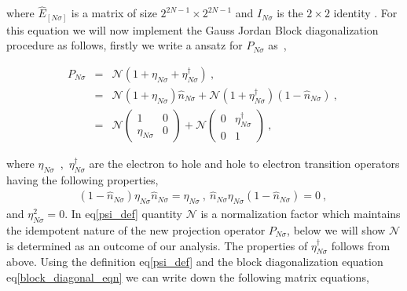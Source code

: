 \documentclass[12pt,a4paper]{article}
\begin{document}
where $\hat{E}_{[N\sigma]}$ is a matrix of size $2^{2N-1}\times 2^{2N-1}$ and $I_{N\sigma}$ is the $2\times 2$ identity . For this equation we will now implement the Gauss Jordan Block diagonalization procedure as follows, firstly we write a ansatz for $P_{N\sigma}$ as~,
\begin{tcolorbox}
\begin{eqnarray}
P_{N\sigma} &=& \mathcal{N}(1+\eta_{N\sigma}+\eta^{\dagger}_{N\sigma})~,\nonumber\\
&=&\mathcal{N}(1+\eta_{N\sigma})\hat{n}_{N\sigma}+\mathcal{N}(1+\eta^{\dagger}_{N\sigma})(1-\hat{n}_{N\sigma})~,~\nonumber\\
&=&\mathcal{N}\begin{pmatrix}
1 & 0\\
\eta_{N\sigma} & 0
\end{pmatrix}+\mathcal{N}\begin{pmatrix}
0 & \eta^{\dagger}_{N\sigma}\\
0 & 1
\end{pmatrix}~,\label{psi_def}
\end{eqnarray}
\end{tcolorbox}
where $\eta_{N\sigma}$~,~$\eta^{\dagger}_{N\sigma}$ are the electron to hole and hole to electron transition operators having the following properties,
\begin{eqnarray}
(1-\hat{n}_{N\sigma})\eta_{N\sigma}\hat{n}_{N\sigma}=\eta_{N\sigma}~,~\hat{n}_{N\sigma}\eta_{N\sigma}(1-\hat{n}_{N\sigma})=0~,~\nonumber
\end{eqnarray}
and $\eta^{2}_{N\sigma}=0$. In eq\eqref{psi_def} quantity $\mathcal{N}$ is a normalization factor which maintains the idempotent nature of the new projection operator $P_{N\sigma}$, below we will show $\mathcal{N}$ is determined as an outcome of our analysis.
The properties of $\eta^{\dagger}_{N\sigma}$ follows from above.
Using the definition eq\eqref{psi_def} and the block diagonalization equation eq\eqref{block_diagonal_eqn} we can write down the following matrix equations,
\end{document}
